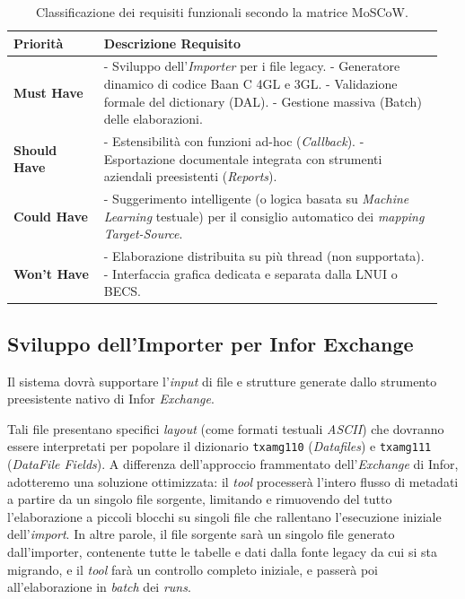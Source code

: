 \begin{table}[H]
    \centering
    \begin{tabular}{@{} p{0.20\linewidth} p{0.75\linewidth} @{}}
        \toprule
        \textbf{Priorità} & \textbf{Descrizione Requisito} \\
        \midrule
        \textbf{Must Have} & 
        - Sviluppo dell'\textit{Importer} per i file legacy. \newline
        - Generatore dinamico di codice Baan C 4GL e 3GL. \newline
        - Validazione formale del dictionary (DAL). \newline
        - Gestione massiva (Batch) delle elaborazioni. \\
        \midrule
        \textbf{Should Have} & 
        - Estensibilità con funzioni ad-hoc (\textit{Callback}). \newline
        - Esportazione documentale integrata con strumenti aziendali preesistenti (\textit{Reports}). \\
        \midrule
        \textbf{Could Have} & 
        - Suggerimento intelligente (o logica basata su \textit{Machine Learning} testuale) per il consiglio automatico dei \textit{mapping Target-Source}. \\
        \midrule
        \textbf{Won't Have} & 
        - Elaborazione distribuita su più thread (non supportata). \newline
        - Interfaccia grafica dedicata e separata dalla LNUI o BECS. \\
        \bottomrule
    \end{tabular}
    \caption{Classificazione dei requisiti funzionali secondo la matrice MoSCoW.}
    \label{tab:moscow_requisiti}
\end{table}

\subsection{Sviluppo dell'Importer per Infor Exchange}
Il sistema dovrà supportare l'\textit{input} di file e strutture generate dallo strumento preesistente nativo di Infor \textit{Exchange}.

Tali file presentano specifici \textit{layout} (come formati testuali \textit{ASCII}) che dovranno essere interpretati per
popolare il dizionario \texttt{txamg110} (\textit{Datafiles}) e \texttt{txamg111} (\textit{DataFile Fields}).
A differenza dell'approccio frammentato dell'\textit{Exchange} di Infor, adotteremo una soluzione ottimizzata: il \textit{tool} processerà
l'intero flusso di metadati a partire da un singolo file sorgente, limitando e rimuovendo del tutto l'elaborazione a piccoli blocchi
su singoli file che rallentano l'esecuzione iniziale dell'\textit{import}.
In altre parole, il file sorgente sarà un singolo file generato dall'importer, contenente tutte le tabelle e dati dalla fonte
legacy da cui si sta migrando, e il \textit{tool} farà un controllo completo iniziale, e passerà poi all'elaborazione in \textit{batch} dei \textit{runs}.

